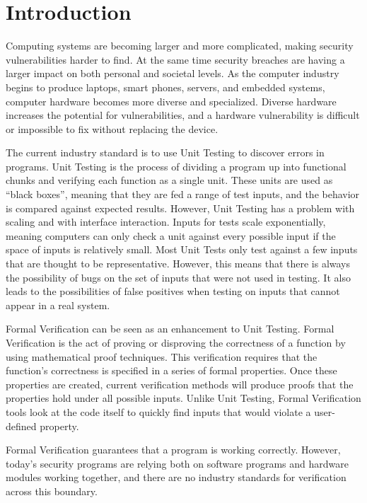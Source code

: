 \chapter{Introduction}

Computing systems are becoming larger and more complicated, making security
vulnerabilities harder to find.
At the same time security breaches are having a larger impact on both personal and societal levels.
As the computer industry begins to produce laptops, smart phones, servers, and embedded systems, computer
hardware becomes more diverse and specialized. Diverse hardware increases the
potential for vulnerabilities, and a hardware vulnerability is difficult or
impossible to fix without replacing the device. 

The current industry standard is to use Unit Testing to discover errors in programs. 
Unit Testing is the process of dividing a program up into functional chunks and
verifying each function as a single unit. 
These units are used as ``black boxes'', meaning that they are fed a range
of test inputs, and the behavior is compared against expected results.
However, Unit Testing has a problem with scaling and with interface interaction.
Inputs for tests scale exponentially, meaning computers can only check a unit against
every possible input if the space of inputs is relatively small. 
Most Unit Tests only test against a few inputs that are thought to be
representative. 
However, this means that there is always the possibility of bugs
on the set of inputs that were not used in testing.
It also leads to the possibilities of false positives when testing on inputs that cannot appear in a real system.

Formal Verification can be seen as an enhancement to Unit Testing. 
Formal Verification is the act of proving or disproving the correctness of a
function by using mathematical proof techniques. 
This verification requires that the function's correctness is specified in a
series of formal properties.
Once these properties are created, current verification methods 
will produce proofs that the properties hold under all possible inputs.
Unlike Unit Testing, Formal Verification tools look at the code itself to quickly find inputs that would violate a user-defined property. 

Formal Verification guarantees that a program is working correctly. 
However, today's security programs are relying both on software programs and
hardware modules working together, and there are no industry standards for
 verification across this boundary.

